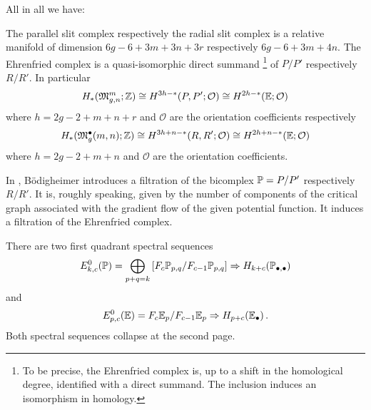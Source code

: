 All in all we have:
\begin{thm*}
    The parallel slit complex respectively the radial slit complex is a relative manifold of dimension $6g-6+3m+3n+3r$ respectively $6g-6+3m+4n$.
    The Ehrenfried complex is a quasi-isomorphic direct summand%
    \footnote{%
        To be precise, the Ehrenfried complex is, up to a shift in the homological degree, identified with a direct summand.
        The inclusion induces an isomorphism in homology.
    } of $P/P'$ respectively $R/R'$.
    In particular
    \[
        H_\ast(\mathfrak{M}^m_{g,n};\mathbb Z) \cong H^{3h-\ast}(P,P'; \mathcal O) \cong H^{2h-\ast}(\mathbb E; \mathcal O)
    \]
    where $h = 2g-2+m+n+r$ and $\mathcal O$ are the orientation coefficients respectively
    \[
        H_\ast(\mathfrak{M}^\bullet_g(m, n);\mathbb Z) \cong H^{3h+n-\ast}(R,R'; \mathcal O) \cong H^{2h+n-\ast}(\mathbb E; \mathcal O)
    \]
    where $h=2g-2+m+n$ and $\mathcal O$ are the orientation coefficients.
\end{thm*}

In \cite{Boedigheimer201314}, Bödigheimer introduces a filtration of the bicomplex $\mathbb P = P/P'$ respectively $R/R'$.
It is, roughly speaking, given by the number of components of the critical graph associated with the gradient flow of the given potential function.
It induces a filtration of the Ehrenfried complex.
\begin{prop*}[Bödigheimer]
    There are two first quadrant spectral sequences
    \[
        E^0_{k,c}(\mathbb P) = \bigoplus_{p+q=k}\left[F_c\mathbb P_{p,q} / F_{c-1}\mathbb P_{p,q} \right] \Rightarrow H_{k+c}( \mathbb P_{\bullet, \bullet} )
    \]
    and
    \[
        E^0_{p,c}(\mathbb E) = F_c\mathbb E_p / F_{c-1}\mathbb E_p \Rightarrow H_{p+c}( \mathbb E_\bullet ) \,.
    \]
    Both spectral sequences collapse at the second page.
\end{prop*}

